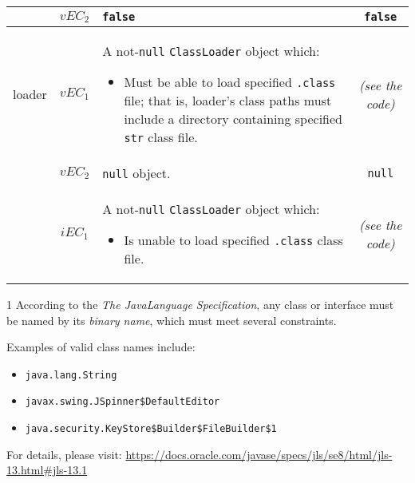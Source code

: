 \documentclass[sigconf]{acmart}
\begin{document}
\begin{table*}
\begin{threeparttable}[b]
\begin{tabular}{l|cm{10.5cm}|c}
\\\cline{2-4}

& $vEC_2$ & \texttt{false} & \texttt{false}

\\\hline

loader & $vEC_1$ & A not-\texttt{null} \texttt{ClassLoader} object which: 

\begin{itemize}
\item Must be able to load specified \texttt{.class} file; that is, loader's class paths must include a directory containing specified \texttt{str} class file.
\end{itemize}

 & \textit{(see the code)}

\\\cline{2-4}

& $vEC_2$ & \texttt{null} object.\tnote{[3]} & \texttt{null}

\\\cline{2-4}

& $iEC_1$ & A not-\texttt{null} \texttt{ClassLoader} object which: 

\begin{itemize}
\item Is unable to load specified \texttt{.class} class file. 
\end{itemize}

 & \textit{(see the code)}

\\

\bottomrule
\end{tabular}
   \begin{tablenotes}
     \item[1] According to the \textit{The Java\texttrademark Language Specification}, any class or interface must be named by its \textit{binary name}, which must meet several constraints. 
     
     Examples of valid class names include:
\begin{itemize}
\item \texttt{java.lang.String}
\item \texttt{javax.swing.JSpinner\$DefaultEditor}
\item \texttt{java.security.KeyStore\$Builder\$FileBuilder\$1}
\end{itemize}
       
For details, please visit: \url{https://docs.oracle.com/javase/specs/jls/se8/html/jls-13.html#jls-13.1}
     

\end{tablenotes}
\end{threeparttable}
\end{table*}
\end{document}
